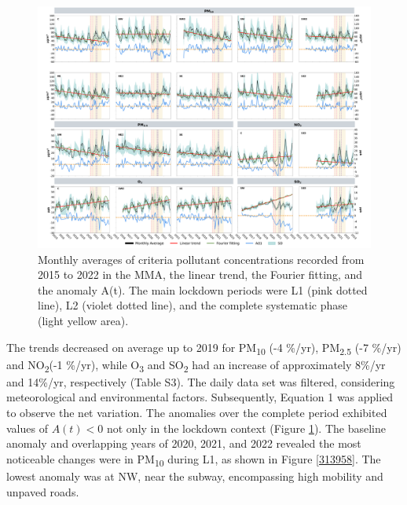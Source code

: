 \documentclass[preprint,12pt]{elsarticle}
\begin{document}
\begin{figure}[H]
	\begin{center}
		\includegraphics[width=1.00\textwidth]{figures/monthly_fourier.pdf}
		\caption{{Monthly averages of criteria pollutant concentrations recorded from 2015 to 2022 in the MMA, the linear trend, the Fourier fitting, and the anomaly A(t). The main lockdown periods were L1 (pink dotted line), L2 (violet dotted line), and the complete systematic phase (light yellow area).
						{\label{686668}}%
				}}
	\end{center}
\end{figure}
The trends decreased on average up to 2019 for PM\textsubscript{10} (-4 \%/yr), PM\textsubscript{2.5} (-7 \%/yr) and NO\textsubscript{2}(-1 \%/yr), while O\textsubscript{3} and SO\textsubscript{2} had an increase of approximately 8\%/yr and 14\%/yr, respectively (Table S3). The daily data set was filtered, considering meteorological and environmental factors. Subsequently, Equation 1 was applied to observe the net variation. The anomalies over the complete period exhibited values of \(A\left(t\right)<0\) not only in the lockdown context (Figure \ref{686668}). The baseline anomaly and overlapping years of 2020, 2021, and 2022 revealed the most noticeable changes were in PM\textsubscript{10} during L1, as shown in Figure \ref{313958}. The lowest anomaly was at NW, near the subway, encompassing high mobility and unpaved roads.
\end{document}
